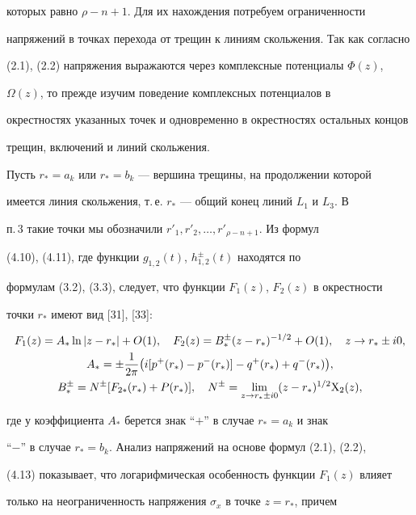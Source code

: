 которых равно $\rho-n+1$. Для их нахождения потребуем ограниченности 


напряжений в точках перехода от трещин к линиям скольжения. Так как согласно 


(2.1), (2.2) напряжения выражаются через комплексные потенциалы $\Phi(z)$, 


$\Omega(z)$, то прежде изучим поведение комплексных потенциалов в 


окрестностях указанных точек и одновременно в окрестностях остальных концов 


трещин, включений и линий скольжения. 


 


Пусть $r_*=a_k$ или $r_*=b_k$ --- вершина трещины, на продолжении которой 


имеется линия скольжения, т.\,е. $r_*$ --- общий конец линий $L_1$ и $L_3$. В 


п.\,3 такие точки мы обозначили $r'_1,r'_2,\dotsc,r'_{\rho-n+1}$. Из формул 


(4.10), (4.11), где функции $g_{1,2}(t)$, $h^\pm_{1,2}(t)$ находятся по 


формулам (3.2), (3.3), следует, что функции $F_1(z)$, $F_2(z)$ в окрестности 


точки $r_*$ имеют вид [31], [33]: 


\begin{gather} 


F_1(z)=A_*\ln|z-r_*|+O(1),\quad F_2(z)=B^\pm_*(z-r_*)^{-1/2} 


+O(1),\quad z\to r_*\pm i0,\\ 


A_*=\pm\frac{1}{2\pi}\big(i[p^+(r_*)-p^-(r_*)]-q^+(r_*)+ 


q^-(r_*)\big),\notag\\ 


B^\pm_*=N^\pm[F_{2\ast}(r_*)+P(r_*)],\quad 


N^\pm=\lim_{z\to r_*\pm i0}(z-r_*)^{1/2}\X_2(z),\notag 


\end{gather} 


где у коэффициента $A_*$ берется знак ``$+$'' в случае $r_*=a_k$ и знак 


``$-$'' в случае $r_*=b_k$. Анализ напряжений на основе формул (2.1), (2.2), 


(4.13) показывает, что логарифмическая особенность функции $F_1(z)$ влияет 


только на неограниченность напряжения $\sigma_x$ в точке $z=r_*$, причем 


